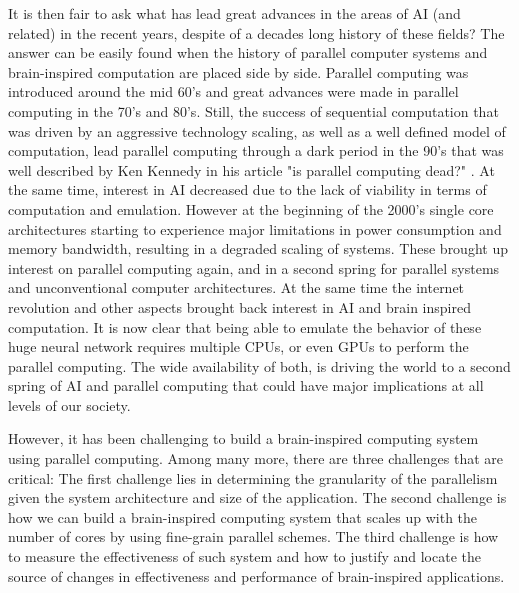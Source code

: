 It is then fair to ask what has lead great advances in the areas of AI (and related) in the recent years, despite of a decades long history of these fields? The answer can be easily found when the history of parallel computer systems and brain-inspired computation are placed side by side. Parallel computing was introduced around the mid 60's and great advances were made in parallel computing in the 70's and 80's. Still, the success of sequential computation that was driven by an aggressive technology scaling, as well as a well defined model of computation, lead parallel computing through a dark period in the 90's that was well described by Ken Kennedy in his article "is parallel computing dead?" \cite{kenedy96}. At the same time, interest in AI decreased due to the lack of viability in terms of computation and emulation. However at the beginning of the 2000's single core architectures starting to experience major limitations in power consumption and memory bandwidth, resulting in a degraded scaling of systems. These brought up interest on parallel computing again, and in a second spring for parallel systems and unconventional computer architectures. At the same time the internet revolution and other aspects brought back interest in AI and brain inspired computation. It is now clear that being able to emulate the behavior of these huge neural network requires multiple CPUs, or even GPUs to perform the parallel computing. The wide availability of both, is driving the world to a second spring of AI and parallel computing that could have major implications at all levels of our society. 

However, it has been challenging to build a brain-inspired computing system using parallel computing. Among many more, there are three challenges that are critical: The first challenge lies in determining the granularity of the parallelism given the system architecture and size of the application. The second challenge is how we can build a brain-inspired computing system that scales up with the number of cores by using fine-grain parallel schemes. The third challenge is how to measure the effectiveness of such system and how to justify and locate the source of changes in effectiveness and performance of brain-inspired applications. 

